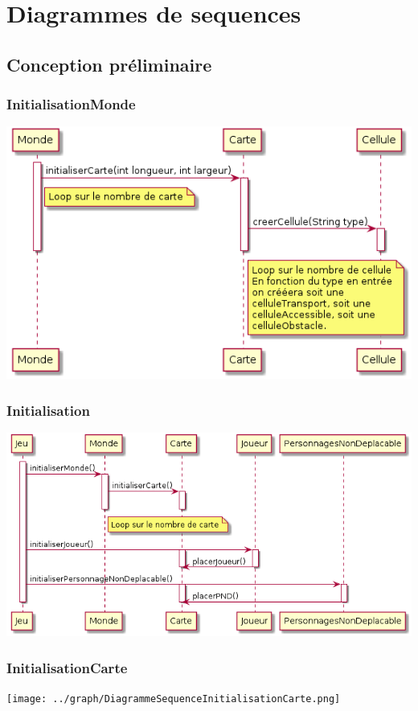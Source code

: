 \chapter{Diagrammes de sequences}
    \section{Conception préliminaire}
        \subsection{InitialisationMonde}
            \includegraphics[scale=0.5]{../graph/DiagrammeSequenceInitialisationMonde.png}
        \subsection{Initialisation}
            \includegraphics[scale=0.5]{../graph/DiagrammeSequenceInitialisation.png}
        \subsection{InitialisationCarte}
            \texttt{[image: ../graph/DiagrammeSequenceInitialisationCarte.png]}
